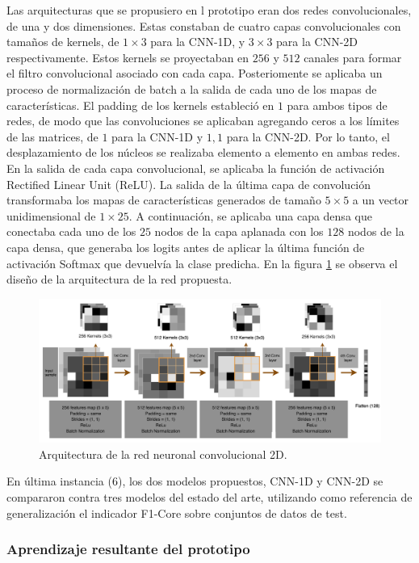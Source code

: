 \documentclass{uathesis-es}
\begin{document}
Las arquitecturas que se propusiero en l prototipo eran dos redes convolucionales, de una y dos dimensiones. Estas constaban de cuatro capas convolucionales con tamaños de kernels, de $1 \times 3$ para la CNN-1D, y $3 \times 3$ para la CNN-2D respectivamente. Estos kernels se proyectaban en $256$ y $512$ canales para formar el filtro convolucional asociado con cada capa. Posteriomente se aplicaba un proceso de normalización de batch a la salida de cada uno de los mapas de características. El padding de los kernels estableció en $1$ para ambos tipos de redes, de modo que las convoluciones se aplicaban agregando ceros a los límites de las matrices, de $1$ para la CNN-1D y ${1, 1}$ para la CNN-2D. Por lo tanto, el desplazamiento de los núcleos se realizaba elemento a elemento en ambas redes. En la salida de cada capa convolucional, se aplicaba la función de activación Rectified Linear Unit  (ReLU). La salida de la última capa de convolución transformaba los mapas de características generados de tamaño $5 \times 5$ a un vector unidimensional de $1 \times 25$. A continuación, se aplicaba una capa densa que conectaba cada uno de los $25$ nodos de la capa aplanada con los $128$ nodos de la capa densa, que generaba los logits antes de aplicar la última función de activación Softmax que devuelvía la clase predicha. En la figura \ref{TASPCNNIMAGE} se observa el diseño de la arquitectura de la red propuesta.

\begin{figure}[H]
	\centering
	\includegraphics[width=15cm]{Figures/1stPaper/TASPCNN.png}
	\caption{Arquitectura de la red neuronal convolucional 2D.}
	\label{TASPCNNIMAGE}
\end{figure}

En última instancia (6), los dos modelos propuestos, CNN-1D y CNN-2D se compararon contra tres modelos del estado del arte, utilizando como referencia de generalización el indicador F1-Core sobre conjuntos de datos de test.


\subsubsection*{Aprendizaje resultante del prototipo}
\end{document}
